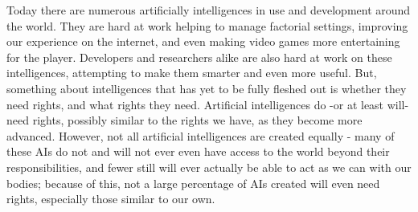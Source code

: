 Today there are numerous artificially intelligences in use and development around the world. They are hard at work helping to manage factorial settings, improving our experience on the internet, and even making video games more entertaining for the player. Developers and researchers alike are also hard at work on these intelligences, attempting to make them smarter and even more useful. But, something about intelligences that has yet to be fully fleshed out is whether they need rights, and what rights they need. Artificial intelligences do -or at least will- need rights, possibly similar to the rights we have, as they become more advanced. However, not all artificial intelligences are created equally - many of these AIs do not and will not ever even have access to the world beyond their responsibilities, and fewer still will ever actually be able to act as we can with our bodies; because of this, not a large percentage of AIs created will even need rights, especially those similar to our own.